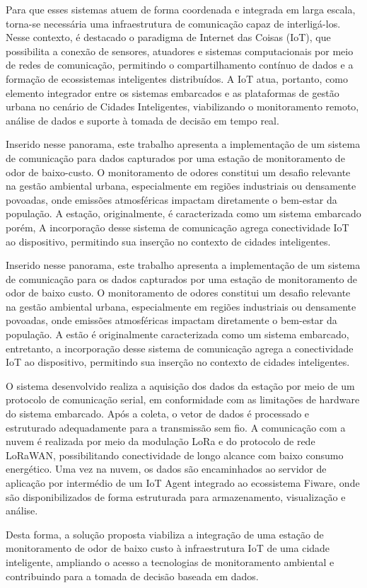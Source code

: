 Para que esses sistemas atuem de forma coordenada e integrada em larga escala, torna-se necessária uma infraestrutura de comunicação capaz de interligá-los. Nesse contexto, é destacado o paradigma de Internet das Coisas (IoT), que possibilita a conexão de sensores, atuadores e sistemas computacionais por meio de redes de comunicação, permitindo o compartilhamento contínuo de dados e a formação de ecossistemas inteligentes distribuídos. A IoT atua, portanto, como elemento integrador entre os sistemas embarcados e as plataformas de gestão urbana no cenário de Cidades Inteligentes, viabilizando o monitoramento remoto, análise de dados e suporte à tomada de decisão em tempo real.

Inserido nesse panorama, este trabalho apresenta a implementação de um sistema de comunicação para dados capturados por uma estação de monitoramento de odor de baixo-custo. O monitoramento de odores constitui um desafio relevante na gestão ambiental urbana, especialmente em regiões industriais ou densamente povoadas, onde emissões atmosféricas impactam diretamente o bem-estar da população. A estação, originalmente, é caracterizada como um sistema embarcado porém, A incorporação desse sistema de comunicação agrega conectividade IoT ao dispositivo, permitindo sua inserção no contexto de cidades inteligentes. 

Inserido nesse panorama, este trabalho apresenta a implementação de um sistema de comunicação para os dados capturados por uma estação de monitoramento de odor de baixo custo. O monitoramento de odores constitui um desafio relevante na gestão ambiental urbana, especialmente em regiões industriais ou densamente povoadas, onde emissões atmosféricas impactam diretamente o bem-estar da população. A estão é originalmente caracterizada como um sistema embarcado, entretanto, a incorporação desse sistema de comunicação agrega a conectividade IoT ao dispositivo, permitindo sua inserção no contexto de cidades inteligentes.

O sistema desenvolvido realiza a aquisição dos dados da estação por meio de um protocolo de comunicação serial, em conformidade com as limitações de hardware do sistema embarcado. Após a coleta, o vetor de dados é processado e estruturado adequadamente para a transmissão sem fio. A comunicação com a nuvem é realizada por meio da modulação LoRa e do protocolo de rede LoRaWAN, possibilitando conectividade de longo alcance com baixo consumo energético. Uma vez na nuvem, os dados são encaminhados ao servidor de aplicação por intermédio de um IoT Agent integrado ao ecossistema Fiware, onde são disponibilizados de forma estruturada para armazenamento, visualização e análise.

Desta forma, a solução proposta viabiliza a integração de uma estação de monitoramento de odor de baixo custo à infraestrutura IoT de uma cidade inteligente, ampliando o acesso a tecnologias de monitoramento ambiental e contribuindo para a tomada de decisão baseada em dados.
